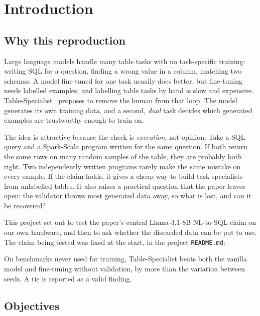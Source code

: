 \chapter{Introduction}\label{ch:intro}

\section{Why this reproduction}

Large language models handle many table tasks with no task-specific training: writing SQL for a question,
finding a wrong value in a column, matching two schemas. A model fine-tuned for one task usually does better, but
fine-tuning needs labelled examples, and labelling table tasks by hand is slow and expensive.
Table-Specialist~\cite{xing2024tablellmspecialist} proposes to remove the human from that loop. The model generates
its own training data, and a second, \emph{dual} task decides which generated examples are trustworthy enough to train
on.

The idea is attractive because the check is \emph{execution}, not opinion. Take a SQL query and a Spark-Scala program
written for the same question. If both return the same rows on many random samples of the table, they are probably
both right. Two independently written programs rarely make the same mistake on every sample. If the claim holds, it
gives a cheap way to build task specialists from unlabelled tables. It also raises a practical question that the paper
leaves open: the validator throws most generated data away, so what is lost, and can it be recovered?

This project set out to test the paper's central Llama-3.1-8B NL-to-SQL claim on our own hardware, and then to ask
whether the discarded data can be put to use. The claim being tested was fixed at the start, in the project
\texttt{README.md}:

\begin{keypoint}
On benchmarks never used for training, Table-Specialist beats both the vanilla model and fine-tuning without
validation, by more than the variation between seeds. A tie is reported as a valid finding.
\end{keypoint}

\section{Objectives}

